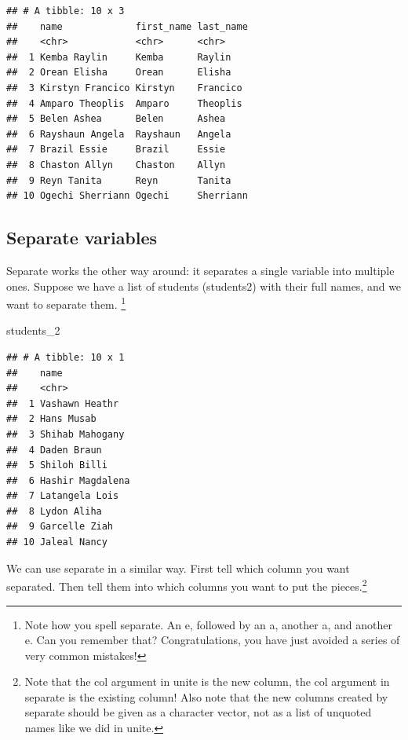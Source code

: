 \documentclass[]{tufte-book}
\newenvironment{Shaded}{}{}
\newcommand{\DecValTok}[1]{\textcolor[rgb]{0.25,0.63,0.44}{#1}}
\newcommand{\NormalTok}[1]{#1}
\begin{document}
\begin{verbatim}
## # A tibble: 10 x 3
##    name             first_name last_name
##    <chr>            <chr>      <chr>    
##  1 Kemba Raylin     Kemba      Raylin   
##  2 Orean Elisha     Orean      Elisha   
##  3 Kirstyn Francico Kirstyn    Francico 
##  4 Amparo Theoplis  Amparo     Theoplis 
##  5 Belen Ashea      Belen      Ashea    
##  6 Rayshaun Angela  Rayshaun   Angela   
##  7 Brazil Essie     Brazil     Essie    
##  8 Chaston Allyn    Chaston    Allyn    
##  9 Reyn Tanita      Reyn       Tanita   
## 10 Ogechi Sherriann Ogechi     Sherriann
\end{verbatim}

\hypertarget{separate-variables}{%
\subsection{Separate variables}\label{separate-variables}}

Separate works the other way around: it separates a single variable into multiple ones. Suppose we have a list of students (students2) with their full names, and we want to separate them. \footnote{Note how you spell separate. An e, followed by an a, another a, and another e. Can you remember that? Congratulations, you have just avoided a series of very common mistakes!}

\begin{Shaded}
\begin{Highlighting}[]
\NormalTok{students_}\DecValTok{2}
\end{Highlighting}
\end{Shaded}

\begin{verbatim}
## # A tibble: 10 x 1
##    name            
##    <chr>           
##  1 Vashawn Heathr  
##  2 Hans Musab      
##  3 Shihab Mahogany 
##  4 Daden Braun     
##  5 Shiloh Billi    
##  6 Hashir Magdalena
##  7 Latangela Lois  
##  8 Lydon Aliha     
##  9 Garcelle Ziah   
## 10 Jaleal Nancy
\end{verbatim}

We can use separate in a similar way. First tell which column you want separated. Then tell them into which columns you want to put the pieces.\footnote{Note that the col argument in unite is the new column, the col argument in separate is the existing column! Also note that the new columns created by separate should be given as a character vector, not as a list of unquoted names like we did in unite.}
\end{document}
